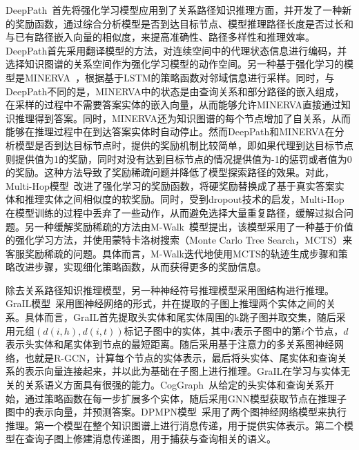 \documentclass[algorithmlist, AutoFakeBold, AutoFakeSlant, figurelist, tablelist, nomlist, masters]{seuthesix}
\begin{document}
DeepPath~\cite{wang2019deeppath}首先将强化学习模型应用到了关系路径知识推理方面，并开发了一种新的奖励函数，通过综合分析模型是否到达目标节点、模型推理路径长度是否过长和与已有路径嵌入向量的相似度，来提高准确性、路径多样性和推理效率。DeepPath首先采用翻译模型的方法，对连续空间中的代理状态信息进行编码，并选择知识图谱的关系空间作为强化学习模型的动作空间。另一种基于强化学习的模型是MINERVA~\cite{das2018go}，根据基于LSTM的策略函数对邻域信息进行采样。同时，与DeepPath不同的是，MINERVA中的状态是由查询关系和部分路径的嵌入组成，在采样的过程中不需要答案实体的嵌入向量，从而能够允许MINERVA直接通过知识推理得到答案。同时，MINERVA还为知识图谱的每个节点增加了自关系，从而能够在推理过程中在到达答案实体时自动停止。然而DeepPath和MINERVA在分析模型是否到达目标节点时，提供的奖励机制比较简单，即如果代理到达目标节点则提供值为1的奖励，同时对没有达到目标节点的情况提供值为-1的惩罚或者值为0的奖励。这种方法导致了奖励稀疏问题并降低了模型探索路径的效果。对此，Multi-Hop模型~\cite{lin2018multi}改进了强化学习的奖励函数，将硬奖励替换成了基于真实答案实体和推理实体之间相似度的软奖励。同时，受到dropout技术的启发，Multi-Hop在模型训练的过程中丢弃了一些动作，从而避免选择大量重复路径，缓解过拟合问题。另一种缓解奖励稀疏的方法由M-Walk~\cite{shen2018m}模型提出，该模型采用了一种基于价值的强化学习方法，并使用蒙特卡洛树搜索（Monte Carlo Tree Search，MCTS）来客服奖励稀疏的问题。具体而言，M-Walk迭代地使用MCTS的轨迹生成步骤和策略改进步骤，实现细化策略函数，从而获得更多的奖励信息。

除去关系路径知识推理模型，另一种神经符号推理模型采用图结构进行推理。GraIL模型~\cite{teru2020inductive}采用图神经网络的形式，并在提取的子图上推理两个实体之间的关系。具体而言，GraIL首先提取头实体和尾实体周围的k跳子图并取交集，随后采用元组$(d(i, h), d(i, t))$标记子图中的实体，其中$i$表示子图中的第$i$个节点，$d$表示头实体和尾实体到节点的最短距离。随后采用基于注意力的多关系图神经网络，也就是R-GCN，计算每个节点的实体表示，最后将头实体、尾实体和查询关系的表示向量连接起来，并以此为基础在子图上进行推理。GraIL在学习与实体无关的关系语义方面具有很强的能力。CogGraph~\cite{du2019cognitive}从给定的头实体和查询关系开始，通过策略函数在每一步扩展多个实体，随后采用GNN模型获取节点在推理子图中的表示向量，并预测答案。DPMPN模型~\cite{xu2019dynamically}采用了两个图神经网络模型来执行推理。第一个模型在整个知识图谱上进行消息传递，用于提供实体表示。第二个模型在查询子图上修建消息传递图，用于捕获与查询相关的语义。
\end{document}
